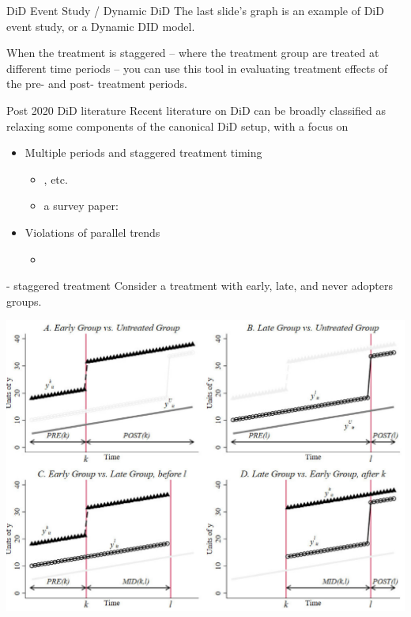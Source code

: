 \documentclass{beamer}
\begin{document}
\begin{frame}{DiD Event Study / Dynamic DiD}
	The last slide's graph is an example of DiD event study, or a Dynamic DID model.\bigskip
	
	When the treatment is staggered -- where the treatment group are treated at different time periods -- you can use this tool in evaluating treatment effects of the pre- and post- treatment periods.\bigskip 
	
\end{frame}

\begin{frame}{Post 2020 DiD literature}
	Recent literature on DiD can be broadly classified as relaxing some components of the canonical DiD setup, with a focus on 
	\begin{itemize}
		\item Multiple periods and staggered treatment timing 
		\begin{itemize}
			\item \cite{de2020two,goodman2021difference,sun2021estimating}, etc. 
			\item a survey paper: \cite{de2023two}
		\end{itemize}
		\item Violations of parallel trends
		\begin{itemize}
			\item \cite{rambachan2023more,callaway2021difference,roth2023parallel}
		\end{itemize}
	\end{itemize}
	 
\end{frame}

\begin{frame}{\cite{goodman2021difference} - staggered treatment}
	Consider a treatment with early, late, and never adopters groups.
\begin{center}
	\includegraphics[width=0.8\linewidth]{./Figures/GoodmanBacon2021}
\end{center}
\end{frame}
\end{document}
